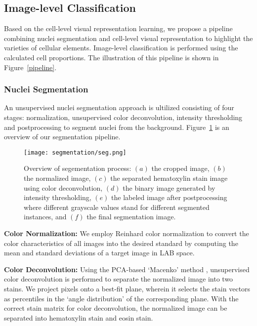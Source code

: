 \documentclass[journal]{IEEEtran}
\begin{document}
\subsection{Image-level Classification}
Based on the cell-level visual representation learning, we propose a pipeline combining nuclei segmentation and cell-level visual representation to highlight the varieties of cellular elements. Image-level classification is performed using the calculated cell proportions. The illustration of this pipeline is shown in Figure~\ref{pipeline}.


\subsubsection{Nuclei Segmentation}

An unsupervised nuclei segmentation approach is ultilized consisting of four stages: normalization, unsupervised color deconvolution, intensity thresholding and postprocessing to segment nuclei from the background. Figure~\ref{segmentation} is an overview of our segmentation pipeline.

\begin{figure}[t]
\texttt{[image: segmentation/seg.png]}
\caption{Overview of segementation process: $\displaystyle (a)$ the cropped image, $\displaystyle (b)$ the normalized image, $\displaystyle (c)$ the separated hematoxylin stain image using color deconvolution, $\displaystyle (d)$ the binary image generated by intensity thresholding, $\displaystyle (e)$ the labeled image after postprocessing where different grayscale values stand for different segmented instances, and $\displaystyle (f)$ the final segmentation image.}
\label{segmentation}
\end{figure}
\textbf{Color Normalization:} We employ Reinhard color normalization \cite{Reinhard2001Color} to convert the color characteristics of all images into the desired standard by computing the mean and standard deviations of a target image in LAB space.

\textbf{Color Deconvolution:} Using the PCA-based `Macenko' method \cite{Macenko2009A}, unsupervised color deconvolution is performed to separate the normalized image into two stains. We project pixels onto a best-fit plane, wherein it selects the stain vectors as percentiles in the `angle distribution' of the corresponding plane. With the correct stain matrix for color deconvolution, the normalized image can be separated into hematoxylin stain and eosin stain.
\end{document}
